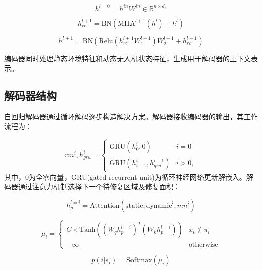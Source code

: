 \begin{equation}
	h^{l=0} = h^{in} W^{in} \in \mathbb{R}^{n \times d_e}
	\label{eq:13a}
\end{equation}

\begin{equation}
	h_{rc}^{l+1} = \text{BN}\left(\text{MHA}^{l+1}(h^l) + h^l\right)
	\label{eq:13b}
\end{equation}

\begin{equation}
	h^{l+1} = \text{BN}\left(\text{Relu}\left(h_{rc}^{l+1} W_1^{l+1}\right) W_2^{l+1} + h_{rc}^{l+1}\right)
	\label{eq:13c}
\end{equation}

编码器同时处理静态环境特征和动态无人机状态特征，生成用于解码器的上下文表示。

\subsection{解码器结构}

自回归解码器通过循环解码逐步构造解决方案。解码器接收编码器的输出，其工作流程为：

\begin{equation}
	rm^{i}, h_{gru}^{i} =
	\left\{
	\begin{array}{ll}
		\text{GRU}(h_{0}^{i}, 0)               & i = 0  \\
		\text{GRU}(h_{i-1}^{i}, h_{gru}^{i-1}) & i > 0,
	\end{array}
	\right.
	\label{eq:14}
\end{equation}
其中，$0$为全零向量，GRU(gated recurrent unit)为循环神经网络更新解嵌入。解码器通过注意力机制选择下一个待修复区域及修复面积：

\begin{equation}
	h_{p}^{l=i} = \text{Attention}(\text{static}, \text{dynamic}^{i}, mn^{i})
	\label{eq:15a}
\end{equation}

\begin{equation}
	\mu_{i} =
	\begin{cases}
		C \times \text{Tanh}\left((W_{q}h_{p}^{l=i})^{T}(W_{k}h_{p}^{l=i})\right) & x_{i} \notin \pi_{i} \\
		-\infty                                                                   & \text{otherwise}
	\end{cases}
	\label{eq:15b}
\end{equation}

\begin{equation}
	p(i|s_{i}) = \text{Softmax}(\mu_{i})
	\label{eq:15c}
\end{equation}

